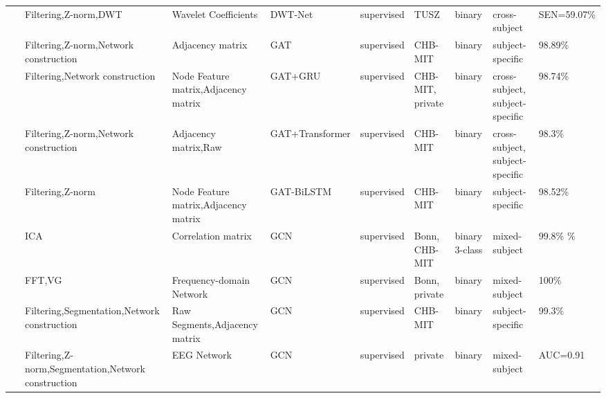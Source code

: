 \begin{table*}[ht]
\begin{tabular}{p{0.4cm}p{2.8cm}p{2cm}p{1.5cm}p{1.9cm}p{1.9cm}p{0.8cm}p{1.8cm}p{1.5cm}}
~\cite{Seizure147} & Filtering,Z-norm,DWT & Wavelet Coefficients & DWT-Net & supervised & TUSZ & binary & cross-subject & SEN=59.07\% \\
~\cite{Seizure148} & Filtering,Z-norm,\newline Network construction & Adjacency matrix & GAT & supervised & CHB-MIT & binary & subject-specific & 98.89\% \\
~\cite{Seizure149} & Filtering,Network \newline construction & Node Feature \newline matrix,Adjacency matrix & GAT+GRU & supervised & CHB-MIT, \newline private & binary & cross-subject, \newline subject-specific & 98.74\% \\
~\cite{Seizure150} & Filtering,Z-norm,\newline Network construction & Adjacency matrix,Raw & GAT\newline +Transformer & supervised & CHB-MIT & binary & cross-subject, \newline subject-specific & 98.3\% \\
~\cite{Seizure151} & Filtering,Z-norm & Node Feature \newline matrix,Adjacency matrix & GAT-BiLSTM & supervised & CHB-MIT & binary & subject-specific & 98.52\% \\
~\cite{Seizure152} & ICA & Correlation \newline matrix & GCN & supervised & Bonn, \newline
CHB-MIT & binary
3-class & mixed-subject & 99.8\% \newline
99.2\% \\
~\cite{Seizure153} & FFT,VG & Frequency-domain Network & GCN & supervised & Bonn, \newline private & binary & mixed-subject & 100\% \\
~\cite{zhao2021eeg} & Filtering,Segmentation,\newline Network construction & Raw Segments,\newline Adjacency matrix & GCN & supervised & CHB-MIT & binary & subject-specific & 99.3\% \\
~\cite{Seizure155} & Filtering,Z-norm,\newline Segmentation,Network construction & EEG Network & GCN & supervised & private & binary & mixed-subject & AUC=0.91 \\

\hline
\end{tabular}
\end{table*}



